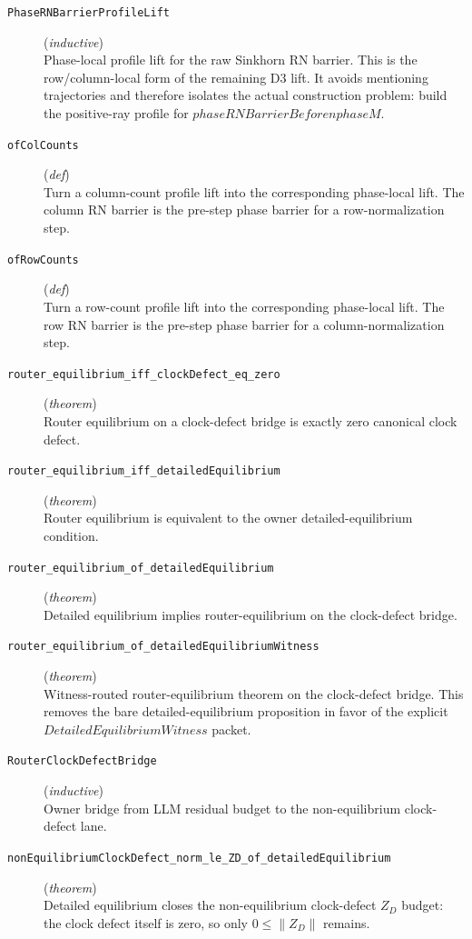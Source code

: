 \documentclass[11pt,a4paper]{article}
\begin{document}
\begin{description}
  \item[\texttt{PhaseRNBarrierProfileLift}] (\textit{inductive}) \\ Phase-local profile lift for the raw Sinkhorn RN barrier. 
This is the row/column-local form of the remaining D3 lift. It avoids mentioning 
trajectories and therefore isolates the actual construction problem: build the 
positive-ray profile for $phaseRNBarrierBefore n phase M$.
  \item[\texttt{ofColCounts}] (\textit{def}) \\ Turn a column-count profile lift into the corresponding phase-local lift. The 
column RN barrier is the pre-step phase barrier for a row-normalization step.
  \item[\texttt{ofRowCounts}] (\textit{def}) \\ Turn a row-count profile lift into the corresponding phase-local lift. The row 
RN barrier is the pre-step phase barrier for a column-normalization step.
  \item[\texttt{router\_equilibrium\_iff\_clockDefect\_eq\_zero}] (\textit{theorem}) \\ Router equilibrium on a clock-defect bridge is exactly zero canonical clock defect.
  \item[\texttt{router\_equilibrium\_iff\_detailedEquilibrium}] (\textit{theorem}) \\ Router equilibrium is equivalent to the owner detailed-equilibrium condition.
  \item[\texttt{router\_equilibrium\_of\_detailedEquilibrium}] (\textit{theorem}) \\ Detailed equilibrium implies router-equilibrium on the clock-defect bridge.
  \item[\texttt{router\_equilibrium\_of\_detailedEquilibriumWitness}] (\textit{theorem}) \\ Witness-routed router-equilibrium theorem on the clock-defect bridge. 
This removes the bare detailed-equilibrium proposition in favor of the explicit 
$DetailedEquilibriumWitness$ packet.
  \item[\texttt{RouterClockDefectBridge}] (\textit{inductive}) \\ Owner bridge from LLM residual budget to the non-equilibrium clock-defect lane.
  \item[\texttt{nonEquilibriumClockDefect\_norm\_le\_ZD\_of\_detailedEquilibrium}] (\textit{theorem}) \\ Detailed equilibrium closes the non-equilibrium clock-defect $Z_D$ budget: 
the clock defect itself is zero, so only $0 \le  \|Z_D\|$ remains.

\end{description}
\end{document}
